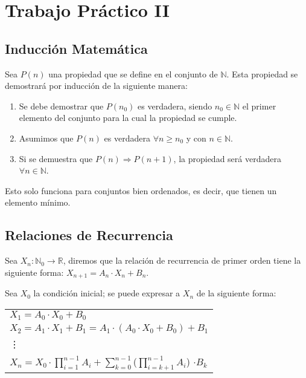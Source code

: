 \documentclass[titlepage,a4paper,12pt,twoside]{article}
\begin{document}
\section{Trabajo Práctico II}

\subsection{Inducción Matemática}

Sea $P(n)$ una propiedad que se define en el conjunto de $\mathbb{N}$. Esta propiedad se demostrará por inducción de la siguiente manera:
\begin{enumerate}
\item Se debe demostrar que $P(n_{0})$ es verdadera, siendo $n_{0} \in \mathbb{N}$ el primer elemento del conjunto para la cual la propiedad se cumple. 
\item Asumimos que $P(n)$ es verdadera $\forall n \geqslant n_{0}$ y con $n \in \mathbb{N}$.
\item Si se demuestra que $P(n) \Rightarrow P(n+1)$, la propiedad será verdadera $\forall n \in \mathbb{N}$.\\
\end{enumerate}

Esto solo funciona para conjuntos bien ordenados, es decir, que tienen un elemento mínimo.

\subsection{Relaciones de Recurrencia}
$ $\\
Sea $X_{n}: \mathbb{N}_{0} \rightarrow \mathbb{R}$, diremos que la relación de recurrencia de primer orden tiene la siguiente forma: $X_{n+1} = A_{n} \cdot X_{n} + B_{n}$.\\

\begin{flushleft}
Sea $X_{0}$ la condición inicial; se puede expresar a $X_{n}$ de la siguiente forma:
\end{flushleft}

\begin{table}[htbp]
\centering
\begin{tabular}{l}
$X_{1} = A_{0} \cdot X_{0} + B_{0}$\\
$X_{2} = A_{1} \cdot X_{1} + B_{1} = A_{1} \cdot (A_{0} \cdot X_{0} + B_{0}) + B_{1}$\\
$ $\vdots$ $\\
$X_{n} = X_{0} \cdot \displaystyle \prod_{i=1}^{n-1} A_{i} + \displaystyle \sum_{k=0}^{n-1}$($\displaystyle \prod_{i=k+1}^{n-1} A_{i}$) $\cdot B_{k}$\\
\end{tabular}
\label{tabla}
\end{table}
\end{document}
